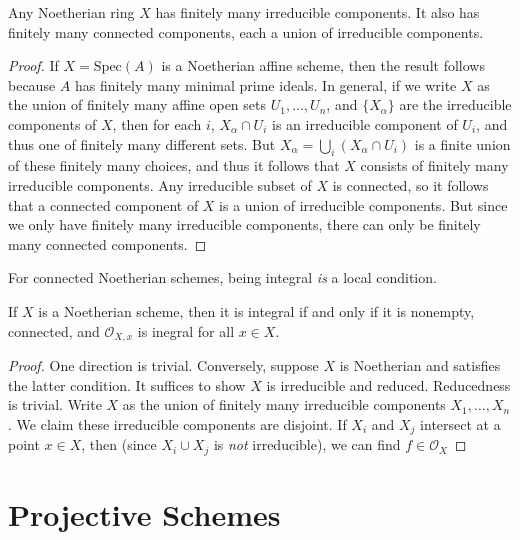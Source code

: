 \begin{theorem}
    Any Noetherian ring $X$ has finitely many irreducible components. It also has finitely many connected components, each a union of irreducible components.
\end{theorem}
\begin{proof}
    If $X = \text{Spec}(A)$ is a Noetherian affine scheme, then the result follows because $A$ has finitely many minimal prime ideals. In general, if we write $X$ as the union of finitely many affine open sets $U_1,\dots,U_n$, and $\{ X_\alpha \}$ are the irreducible components of $X$, then for each $i$, $X_\alpha \cap U_i$ is an irreducible component of $U_i$, and thus one of finitely many different sets. But $X_\alpha = \bigcup_i (X_\alpha \cap U_i)$ is a finite union of these finitely many choices, and thus it follows that $X$ consists of finitely many irreducible components. Any irreducible subset of $X$ is connected, so it follows that a connected component of $X$ is a union of irreducible components. But since we only have finitely many irreducible components, there can only be finitely many connected components.
\end{proof}

For connected Noetherian schemes, being integral \emph{is} a local condition.

\begin{theorem}
    If $X$ is a Noetherian scheme, then it is integral if and only if it is nonempty, connected, and $\mathcal{O}_{X,x}$ is inegral for all $x \in X$.
\end{theorem}
\begin{proof}
    One direction is trivial. Conversely, suppose $X$ is Noetherian and satisfies the latter condition. It suffices to show $X$ is irreducible and reduced. Reducedness is trivial. Write $X$ as the union of finitely many irreducible components $X_1,\dots,X_n$. We claim these irreducible components are disjoint. If $X_i$ and $X_j$ intersect at a point $x \in X$, then (since $X_i \cup X_j$ is \emph{not} irreducible), we can find $f \in \mathcal{O}_X$
\end{proof}












\section{Projective Schemes}
 

